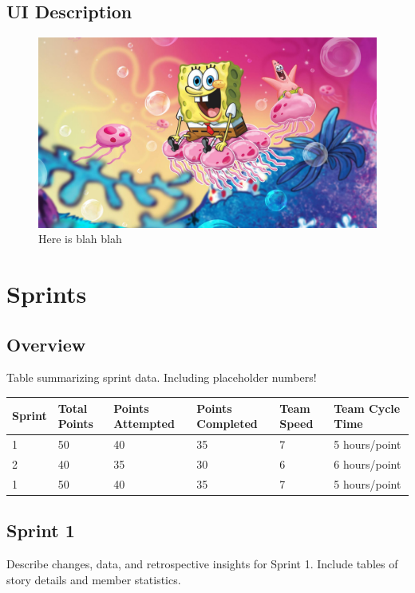 \documentclass[12pt]{article}
\begin{document}
\subsection{UI Description}
\begin{figure}[H] 
    \centering
    \includegraphics[width=\textwidth]{ui_screenshot.png}
    \caption{Here is blah blah}
    \label{fig:ui_screenshot}
\end{figure}

\newpage
\section{Sprints}
\FloatBarrier

\subsection{Overview}
Table summarizing sprint data. Including placeholder numbers!
\begin{longtable}{|p{1.5cm}|p{2.5cm}|p{2.5cm}|p{2.5cm}|p{2.5cm}|p{2.5cm}|}
\hline
\textbf{Sprint} & \textbf{Total Points} & \textbf{Points Attempted} & \textbf{Points Completed} & \textbf{Team Speed} & \textbf{Team Cycle Time} \\ \hline
1 & 50 & 40 & 35 & 7 & 5 hours/point \\ \hline
2 & 40 & 35 & 30 & 6 & 6 hours/point \\ \hline
1 & 50 & 40 & 35 & 7 & 5 hours/point \\ \hline
\end{longtable}


\subsection{Sprint 1}
Describe changes, data, and retrospective insights for Sprint 1. Include tables of story details and member statistics.
\end{document}
